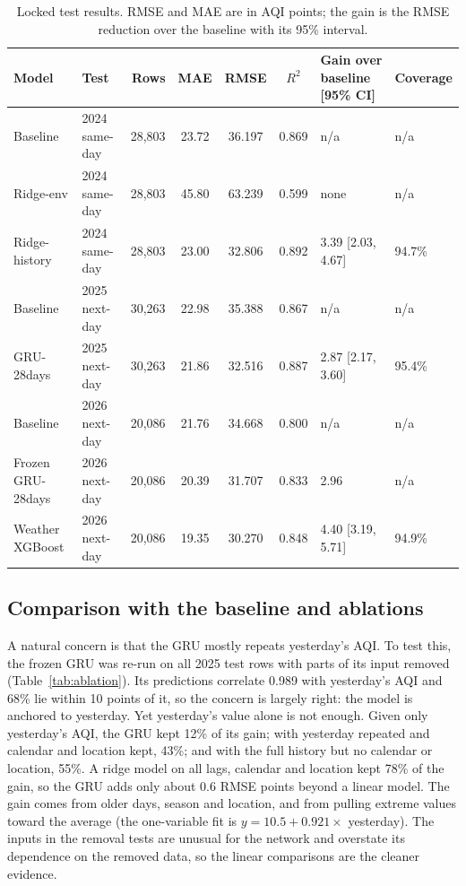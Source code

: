 \documentclass[pdflatex,sn-mathphys-num]{sn-jnl}
\begin{document}
\begin{table}[!htbp]
\centering
\footnotesize
\caption{Locked test results. RMSE and MAE are in AQI points; the gain is the RMSE reduction over the baseline with its 95\% interval.}\label{tab:results}
\begin{tabular}{llrcccll}
\toprule
\textbf{Model} & \textbf{Test} & \textbf{Rows} & \textbf{MAE} & \textbf{RMSE} & \textbf{$R^2$} & \textbf{Gain over baseline [95\% CI]} & \textbf{Coverage} \\
\midrule
Baseline & 2024 same-day & 28,803 & 23.72 & 36.197 & 0.869 & n/a & n/a \\
Ridge-env & 2024 same-day & 28,803 & 45.80 & 63.239 & 0.599 & none & n/a \\
Ridge-history & 2024 same-day & 28,803 & 23.00 & 32.806 & 0.892 & 3.39 [2.03, 4.67] & 94.7\% \\
Baseline & 2025 next-day & 30,263 & 22.98 & 35.388 & 0.867 & n/a & n/a \\
GRU-28days & 2025 next-day & 30,263 & 21.86 & 32.516 & 0.887 & 2.87 [2.17, 3.60] & 95.4\% \\
Baseline & 2026 next-day & 20,086 & 21.76 & 34.668 & 0.800 & n/a & n/a \\
Frozen GRU-28days & 2026 next-day & 20,086 & 20.39 & 31.707 & 0.833 & 2.96 & n/a \\
Weather XGBoost & 2026 next-day & 20,086 & 19.35 & 30.270 & 0.848 & 4.40 [3.19, 5.71] & 94.9\% \\
\bottomrule
\end{tabular}
\par{}
\end{table}

\subsection{Comparison with the baseline and ablations}
A natural concern is that the GRU mostly repeats yesterday's AQI. To test this, the frozen GRU was re-run on all 2025 test rows with parts of its input removed (Table~\ref{tab:ablation}). Its predictions correlate 0.989 with yesterday's AQI and 68\% lie within 10 points of it, so the concern is largely right: the model is anchored to yesterday. Yet yesterday's value alone is not enough. Given only yesterday's AQI, the GRU kept 12\% of its gain; with yesterday repeated and calendar and location kept, 43\%; and with the full history but no calendar or location, 55\%. A ridge model on all lags, calendar and location kept 78\% of the gain, so the GRU adds only about 0.6 RMSE points beyond a linear model. The gain comes from older days, season and location, and from pulling extreme values toward the average (the one-variable fit is $y = 10.5 + 0.921\times$ yesterday). The inputs in the removal tests are unusual for the network and overstate its dependence on the removed data, so the linear comparisons are the cleaner evidence.
\end{document}

